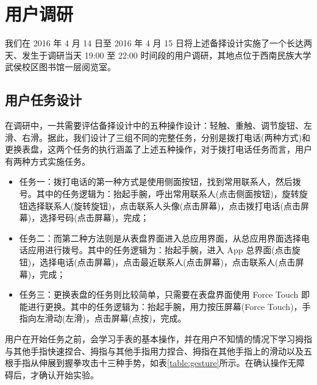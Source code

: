 \chapter{用户调研}

我们在 2016 年 4 月 14 日至 2016 年 4 月 15 日将上述备择设计实施了一个长达两天、发生于调研当天 19:00 至 22:00 时间段的用户调研，其地点位于西南民族大学武侯校区图书馆一层阅览室。

\section{用户任务设计}

在调研中，一共需要评估备择设计中的五种操作设计：轻触、重触、调节旋钮、左滑、右滑。据此，我们设计了三组不同的完整任务，分别是拨打电话(两种方式)和更换表盘，这两个任务的执行涵盖了上述五种操作，对于拨打电话任务而言，用户有两种方式实施任务。

\begin{itemize}
    \kaishu
    \item 任务一：拨打电话的第一种方式是使用侧面按钮，找到常用联系人，然后拨号。其中的任务逻辑为：抬起手腕，呼出常用联系人(点击侧面按钮)，旋转旋钮选择联系人(旋转旋钮)，点击联系人头像(点击屏幕)，点击拨打电话(点击屏幕)，选择号码(点击屏幕)，完成；
    \item 任务二：而第二种方法则是从表盘界面进入总应用界面，从总应用界面选择电话应用进行拨号。其中的任务逻辑为：抬起手腕，进入 App 总界面(点击旋钮)，选择电话(点击屏幕)，点击最近联系人(点击屏幕)，点击联系人(点击屏幕)，完成；
    \item 任务三：更换表盘的任务则比较简单，只需要在表盘界面使用 Force Touch 即能进行更换。其中的任务逻辑为：抬起手腕，用力按压屏幕(Force Touch)，手指向左滑动(左滑)，点击屏幕(点按)，完成。
\end{itemize}

用户在开始任务之前，会学习手表的基本操作，并在用户不知情的情况下学习拇指与其他手指快速捏合、拇指与其他手指用力捏合、拇指在其他手指上的滑动以及五根手指从伸展到握拳攻击十三种手势，如表\ref{table:gesture}所示。在确认操作无障碍后，才确认开始实验。


